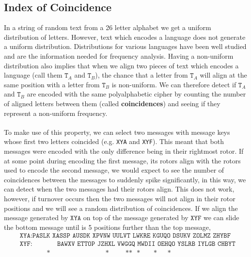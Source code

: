 \subsection{Index of Coincidence}
In a string of random text from a 26 letter alphabet we get a uniform
distribution of letters. However, text which encodes a language does
not generate a uniform distribution. Distributions for various
languages have been well studied and are the information needed for
frequency analysis. Having a non-uniform distribution also implies
that when we align two pieces  of text which encodes a language (call
them $\texttt{T}_A$ and $\texttt{T}_B$), the chance that a letter
from $\texttt{T}_A$ will align at the same position with a letter
from $\texttt{T}_B$ is non-uniform. We can therefore detect if
$\texttt{T}_A$ and $\texttt{T}_B$ are encoded with the same
polyalphabetic cipher by counting the number of aligned letters
between them (called {\bf{coincidences}}) and seeing if they
represent a non-uniform frequency.
\\\\To make use of this property, we can select two messages with
message keys whose first two letters coincided (e.g. \texttt{XYA} and
\texttt{XYF}). This meant that both messages were encoded with the
only difference being in their rightmost rotor. If at some point
during encoding the first message, its rotors align with the rotors
used to encode the second message, we would expect to see the number
of coincidences between the messages to suddenly spike significantly,
in this way, we can detect when the two messages had their rotors
align. This does not work, however, if turnover occurs then the two
messages will not align in their rotor positions and we will see a
random distribution of coincidences. If we align the message
generated by $\texttt{XYA}$ on top of the message generated by
$\texttt{XYF}$ we can slide the bottom message until is 5 positions
further than the top message,
\begin{align*}
  & \texttt{XYA}: \texttt{PASLK XASSP AUSDK XPVNW UULVT LWKRE KGUQO
  DSUKV ZOLMZ ZHYBF}
  \\
  & \texttt{XYF}: \texttt{ }\texttt{ }\texttt{ }\texttt{ }\texttt{
  }\texttt{ }\texttt{BAWXV ETTOP JZHXL VWGGQ MWDII OEHQO YSLRB IYLGB
  CHBYT }
  \\
  &
  \ \ \ \ \ \ \ \ \ \ \ \ \ \ \ \ \ \ \texttt{*}\ \ \ \ \ \ \ \ \ \ \ \ \ \ \ \ \ \ \ \ \ \ \ \ \ \ \ \ \ \ \ \ \ \ \ \ \ \texttt{*}\ \ \ \ \ \ \ \ \ \ \ \texttt{**}\ \ \ \texttt{*}\ \ \ \ \ \ \ \ \ \texttt{*}\ \ \ \ \ \ \ \texttt{*}
\end{align*}
